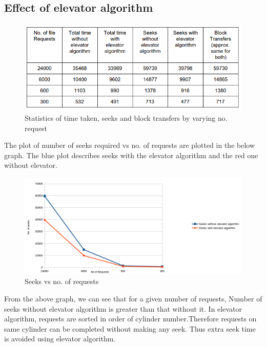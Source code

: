 \documentclass[11pt]{article}
\begin{document}
\subsection{Effect of elevator algorithm}
\paragraph{}

\begin{figure}[ht!]
\center
\includegraphics[scale = 0.70]{images/table1.png}
\caption{Statistics of time taken, seeks and block transfers by varying no. request}
\label{overflow}
\end{figure}



The plot of number of seeks required vs no. of requests are plotted in the below graph. The blue plot describes seeks with the elevator algorithm and the red one without elevator.

\begin{figure}[ht!]
\center
\includegraphics[scale = 0.65]{images/img0.png}
\caption{Seeks vs no. of requests}
\label{overflow}
\end{figure}


From the above graph, we can see that for a given number of requests, Number of seeks without elevator algorithm is greater than that without it. In elevator algorithm, requests are sorted in order of cylinder number.Therefore requests on same cylinder can be completed without making any seek. Thus extra seek time is avoided using elevator algorithm.
\end{document}
